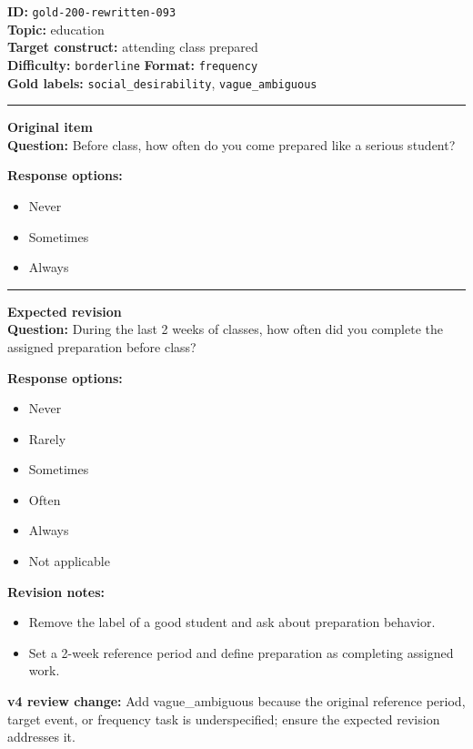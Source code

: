 \documentclass[10pt,a4paper]{article}
\newcommand{\sectionline}{\vspace{0.15em}\hrule\vspace{0.35em}}
\begin{document}
\begin{tcolorbox}[colframe=FlawRed,colback=white,colbacktitle=FlawRed!9,coltitle=black,title={Item 093\hfill Flawed item}]
\textbf{ID:} \texttt{gold-200-rewritten-093}\\
\textbf{Topic:} education\\
\textbf{Target construct:} attending class prepared\\
\textbf{Difficulty:} \texttt{borderline} \quad \textbf{Format:} \texttt{frequency}\\
\textbf{Gold labels:} \texttt{social\_desirability}, \texttt{vague\_ambiguous}\\
\sectionline
\textbf{Original item}\\
\textbf{Question:} Before class, how often do you come prepared like a serious student?
\par\textbf{Response options:}
\begin{itemize}
\item Never
\item Sometimes
\item Always
\end{itemize}
\sectionline
\textbf{Expected revision}\\
\textbf{Question:} During the last 2 weeks of classes, how often did you complete the assigned preparation before class?
\par\textbf{Response options:}
\begin{itemize}
\item Never
\item Rarely
\item Sometimes
\item Often
\item Always
\item Not applicable
\end{itemize}
\par\textbf{Revision notes:}
\begin{itemize}
\item Remove the label of a good student and ask about preparation behavior.
\item Set a 2-week reference period and define preparation as completing assigned work.
\end{itemize}
\par\textbf{v4 review change:} Add vague\_ambiguous because the original reference period, target event, or frequency task is underspecified; ensure the expected revision addresses it.
\end{tcolorbox}
\end{document}
